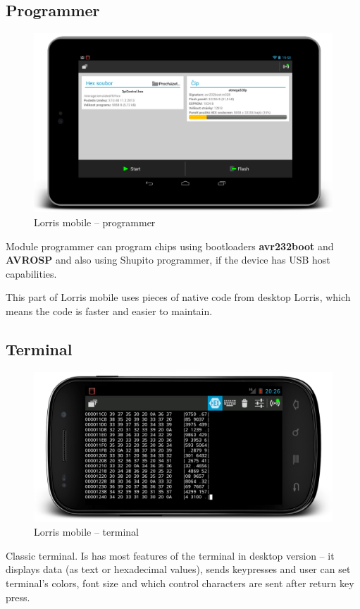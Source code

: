 \documentclass[12pt, a4paper, oneside]{article}
\begin{document}
\subsection{Programmer}
\begin{figure}[H]
\begin{center}
\includegraphics[width=\textwidth]{img/mobile_programmer.png}
\caption{Lorris mobile -- programmer}
\end{center}
\end{figure}
Module programmer can program chips using bootloaders {\bf avr232boot} and {\bf AVROSP} and also using Shupito programmer, if the device has USB host capabilities.

This part of Lorris mobile uses pieces of native code from desktop Lorris, which means the code is faster and easier to maintain.

\subsection{Terminal}
\begin{figure}[H]
\begin{center}
\includegraphics[width=\textwidth]{img/mobile_term.png}
\caption{Lorris mobile -- terminal}
\end{center}
\end{figure}
Classic terminal. Is has most features of the terminal in desktop version -- it displays data (as text or hexadecimal values), sends keypresses and user can set terminal's colors, font size and which control characters are sent after return key press.
\end{document}
